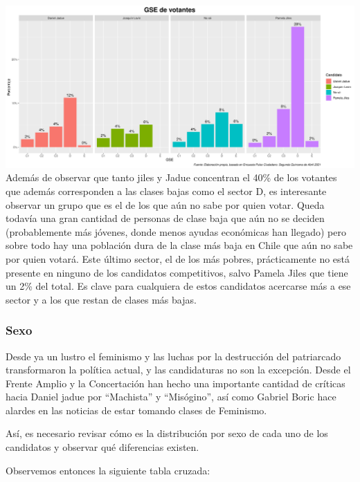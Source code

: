 \documentclass[
]{article}
\begin{document}
\includegraphics{GSEPlot.png} Además de observar que tanto jiles y Jadue
concentran el 40\% de los votantes que además corresponden a las clases
bajas como el sector D, es interesante observar un grupo que es el de
los que aún no sabe por quien votar. Queda todavía una gran cantidad de
personas de clase baja que aún no se deciden (probablemente más jóvenes,
donde menos ayudas económicas han llegado) pero sobre todo hay una
población dura de la clase más baja en Chile que aún no sabe por quien
votará. Este último sector, el de los más pobres, prácticamente no está
presente en ninguno de los candidatos competitivos, salvo Pamela Jiles
que tiene un 2\% del total. Es clave para cualquiera de estos candidatos
acercarse más a ese sector y a los que restan de clases más bajas.

\hypertarget{sexo}{%
\subsubsection{\texorpdfstring{\textbf{Sexo}}{Sexo}}\label{sexo}}

Desde ya un lustro el feminismo y las luchas por la destrucción del
patriarcado transformaron la política actual, y las candidaturas no son
la excepción. Desde el Frente Amplio y la Concertación han hecho una
importante cantidad de críticas hacia Daniel jadue por ``Machista'' y
``Misógino'', así como Gabriel Boric hace alardes en las noticias de
estar tomando clases de Feminismo.

Así, es necesario revisar cómo es la distribución por sexo de cada uno
de los candidatos y observar qué diferencias existen.

Observemos entonces la siguiente tabla cruzada:

\newline
\end{document}
